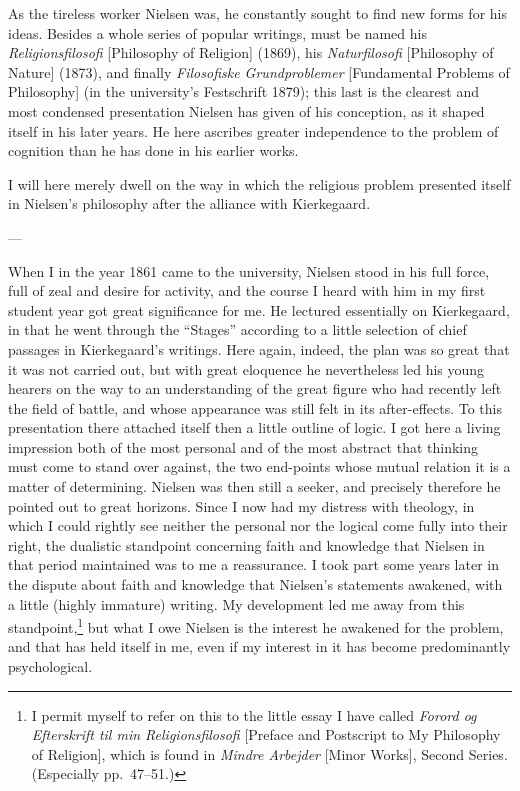 \documentclass[12pt,a4paper]{book}
\newcommand{\opage}[1]{\marginnote{\footnotesize\textit{[#1]}}}
\begin{document}
As the tireless worker Nielsen was, he constantly sought to find new forms for his ideas.
Besides a whole series of popular writings, must be named his \emph{Religionsfilosofi}
[Philosophy of Religion] (\opage{191}1869), his \emph{Naturfilosofi} [Philosophy of Nature] (1873), and
finally \emph{Filosofiske Grundproblemer} [Fundamental Problems of Philosophy] (in the
university's Festschrift 1879); this last is the clearest and most condensed presentation
Nielsen has given of his conception, as it shaped itself in his later years. He here ascribes
greater independence to the problem of cognition than he has done in his earlier works.

I will here merely dwell on the way in which the religious problem presented itself in Nielsen's
philosophy after the alliance with Kierkegaard.

\begin{center}---\end{center}

When I in the year 1861 came to the university, Nielsen stood in his full force, full of zeal
and desire for activity, and the course I heard with him in my first student year got great
significance for me. He lectured essentially on Kierkegaard, in that he went through the
``Stages'' according to a little selection of chief passages in Kierkegaard's writings. Here
again, indeed, the plan was so great that it was not carried out, but with great eloquence he
nevertheless led his young hearers on the way to an understanding of the great figure who had
recently left the field of battle, and whose appearance was still felt in its after-effects. To
this presentation there attached itself then a little outline of logic. I got here a living
impression both of the most personal and of the most abstract that thinking must come to stand
over against, the two end-points whose mutual relation it is a matter of determining. Nielsen
was then still a seeker, and precisely therefore he pointed out to great horizons. Since I now
had my distress with theology, in which I could rightly see neither the personal nor the
logical come fully into their right, the dualistic standpoint concerning faith and knowledge
that Nielsen in that period maintained was to me a reassurance. I took part some years later in
the dispute about faith and knowledge that Nielsen's statements awakened, with a little (highly
immature) writing. My development led me away from this standpoint,\footnote{I permit myself to
refer on this to the little essay I have called \emph{Forord og Efterskrift til min
Religionsfilosofi} [Preface and Postscript to My Philosophy of Religion], which is found in
\emph{Mindre Arbejder} [Minor Works], Second Series. (Especially pp.~47--51.)} \opage{192}but what I owe
Nielsen is the interest he awakened for the problem, and that has held itself in me, even if my
interest in it has become predominantly psychological.
\end{document}
